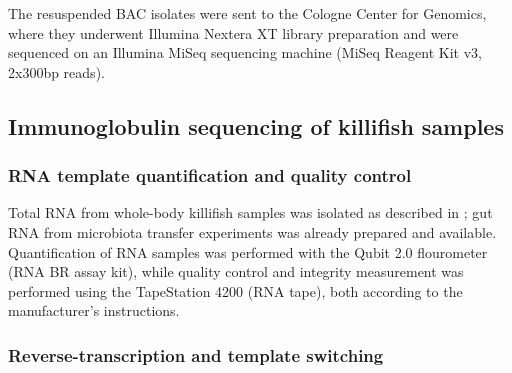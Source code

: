 The resuspended BAC isolates were sent to the Cologne Center for Genomics, where they underwent Illumina Nextera XT library preparation and were sequenced on an Illumina MiSeq sequencing machine (MiSeq Reagent Kit v3, 2x300bp reads).

\subsection{Immunoglobulin sequencing of killifish samples}
\label{sec:methods_molec_igseq}

\subsubsection{RNA template quantification and quality control}
\label{sec:methods_molec_igseq_template}

Total RNA from whole-body killifish samples was isolated as described in ; gut RNA from microbiota transfer experiments \parencite{smith2017microbiota} was already prepared and available. Quantification of RNA samples was performed with the Qubit 2.0 flourometer (RNA BR assay kit), while quality control and integrity measurement was performed using the TapeStation 4200 (RNA tape), both according to the manufacturer's instructions.

\subsubsection{Reverse-transcription and template switching}
\label{sec:methods_molec_igseq_rt}



